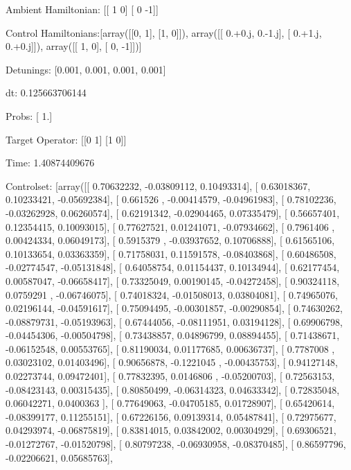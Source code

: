 \documentclass{article}
\begin{document}
    

\newpage

Ambient Hamiltonian: [[ 1  0]
 [ 0 -1]]

Control Hamiltonians:[array([[0, 1],
       [1, 0]]), array([[ 0.+0.j,  0.-1.j],
       [ 0.+1.j,  0.+0.j]]), array([[ 1,  0],
       [ 0, -1]])]

Detunings: [0.001, 0.001, 0.001, 0.001]

 dt: 0.125663706144

Probs: [ 1.]

Target Operator: [[0 1]
 [1 0]]

Time: 1.40874409676

Controlset: [array([[ 0.70632232, -0.03809112,  0.10493314],
       [ 0.63018367,  0.10233421, -0.05692384],
       [ 0.661526  , -0.00414579, -0.04961983],
       [ 0.78102236, -0.03262928,  0.06260574],
       [ 0.62191342, -0.02904465,  0.07335479],
       [ 0.56657401,  0.12354415,  0.10093015],
       [ 0.77627521,  0.01241071, -0.07934662],
       [ 0.7961406 ,  0.00424334,  0.06049173],
       [ 0.5915379 , -0.03937652,  0.10706888],
       [ 0.61565106,  0.10133654,  0.03363359],
       [ 0.71758031,  0.11591578, -0.08403868],
       [ 0.60486508, -0.02774547, -0.05131848],
       [ 0.64058754,  0.01154437,  0.10134944],
       [ 0.62177454,  0.00587047, -0.06658417],
       [ 0.73325049,  0.00190145, -0.04272458],
       [ 0.90324118,  0.0759291 , -0.06746075],
       [ 0.74018324, -0.01508013,  0.03804081],
       [ 0.74965076,  0.02196144, -0.04591617],
       [ 0.75094495, -0.00301857, -0.00290854],
       [ 0.74630262, -0.08879731, -0.05193963],
       [ 0.67444056, -0.08111951,  0.03194128],
       [ 0.69906798, -0.04454306, -0.00504798],
       [ 0.73438857,  0.04896799,  0.08894455],
       [ 0.71438671, -0.06152548,  0.00553765],
       [ 0.81190034,  0.01177685,  0.00636737],
       [ 0.7787008 ,  0.03023102,  0.01403496],
       [ 0.90656878, -0.1221045 , -0.00435753],
       [ 0.94127148,  0.02273744,  0.09472401],
       [ 0.77832395,  0.0146806 , -0.05200703],
       [ 0.72563153, -0.08423143,  0.00315435],
       [ 0.80850499, -0.06314323,  0.04633342],
       [ 0.72835048,  0.06042271,  0.0400363 ],
       [ 0.77649063, -0.04705185,  0.01728907],
       [ 0.65420614, -0.08399177,  0.11255151],
       [ 0.67226156,  0.09139314,  0.05487841],
       [ 0.72975677,  0.04293974, -0.06875819],
       [ 0.83814015,  0.03842002,  0.00304929],
       [ 0.69306521, -0.01272767, -0.01520798],
       [ 0.80797238, -0.06930958, -0.08370485],
       [ 0.86597796, -0.02206621,  0.05685763],
\end{document}
